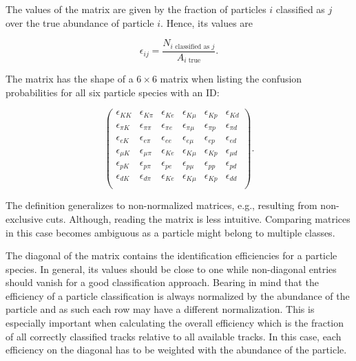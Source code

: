 The values of the matrix are given by the fraction of particles $i$ classified as $j$ over the true abundance of particle $i$. Hence, its values are

\begin{equation}
	\epsilon_{i j} = \frac{N_{i \text{ classified as } j}}{A_{i \text{ true}}}.
\end{equation}

The matrix has the shape of a $6 \times 6$ matrix when listing the confusion probabilities for all six particle species with an ID:

\begin{equation}
	\begin{pmatrix}
		\epsilon_{K K} & \epsilon_{K \pi} & \epsilon_{K e} & \epsilon_{K \mu} & \epsilon_{K p} & \epsilon_{K d} \\
		\epsilon_{\pi K} & \epsilon_{\pi \pi} & \epsilon_{\pi e} & \epsilon_{\pi \mu} & \epsilon_{\pi p} & \epsilon_{\pi d} \\
		\epsilon_{e K} & \epsilon_{e \pi} & \epsilon_{e e} & \epsilon_{e \mu} & \epsilon_{e p} & \epsilon_{e d} \\
		\epsilon_{\mu K} & \epsilon_{\mu \pi} & \epsilon_{K e} & \epsilon_{K \mu} & \epsilon_{K p} & \epsilon_{\mu d} \\
		\epsilon_{p K} & \epsilon_{p \pi} & \epsilon_{p e} & \epsilon_{p \mu} & \epsilon_{p p} & \epsilon_{p d} \\
		\epsilon_{d K} & \epsilon_{d \pi} & \epsilon_{K e} & \epsilon_{K \mu} & \epsilon_{K p} & \epsilon_{d d} \\
	\end{pmatrix}.
\end{equation}

The definition generalizes to non-normalized matrices, e.g., resulting from non-exclusive cuts. Although, reading the matrix is less intuitive. Comparing matrices in this case becomes ambiguous as a particle might belong to multiple classes.

The diagonal of the matrix contains the identification efficiencies for a particle species. In general, its values should be close to one while non-diagonal entries should vanish for a good classification approach. Bearing in mind that the efficiency of a particle classification is always normalized by the abundance of the particle and as such each row may have a different normalization. This is especially important when calculating the overall efficiency which is the fraction of all correctly classified tracks relative to all available tracks. In this case, each efficiency on the diagonal has to be weighted with the abundance of the particle.

